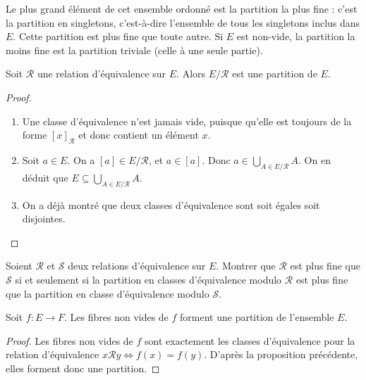 \begin{remarque}
Le plus grand élément de cet ensemble ordonné est la partition la  plus fine : c'est la partition en singletons, c'est-à-dire l'ensemble de tous les singletons inclus dans $E$. Cette partition est plus fine que toute autre. Si $E$ est non-vide, la partition la moins fine est la partition triviale (celle à une seule partie).  
\end{remarque}



\begin{proposition}\label{prop-classes-partition}
Soit $\mathcal R$ une relation d'équivalence sur $E$. Alors $E/\mathcal R$ est une partition de $E$.
\end{proposition}
\begin{proof}
\begin{enumerate}
\item Une classe d'équivalence n'est jamais vide, puisque qu'elle est toujours de la forme $[x]_{\mathcal R}$ et donc contient un élément $x$.
\item Soit $a\in E$. On a $[a] \in E/\mathcal R$, et $a\in [a]$. Donc $a\in \bigcup_{A\in E/\mathcal R} A$. On en déduit que $E\subseteq \bigcup_{A\in E/\mathcal R} A$.
\item On a déjà montré que deux classes d'équivalence sont soit égales soit disjointes.
\end{enumerate}
\end{proof}

\begin{exercice}
Soient $\mathcal R$ et $\mathcal S$ deux relations d'équivalence sur $E$. Montrer que $\mathcal R$ est plus fine que $\mathcal S$ si et seulement si la partition en classes d'équivalence modulo $\mathcal R$ est plus fine que la partition en classe d'équivalence modulo $\mathcal S$.
\end{exercice}

\begin{proposition}\label{prop-fibres-partition}
Soit $f : E\to F$. Les fibres non vides de $f$ forment une partition de l'ensemble $E$.
\end{proposition}
\begin{proof}
Les fibres non vides de $f$ sont exactement les classes d'équivalence pour la relation d'équivalence $x\mathcal R y \iff f(x)=f(y)$. D'après la proposition précédente, elles forment donc une partition.
\end{proof}

